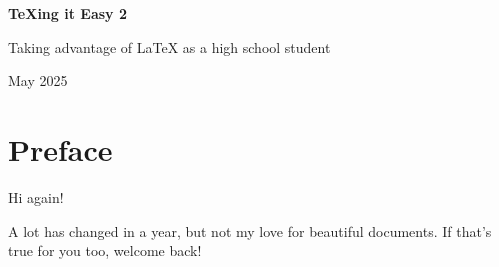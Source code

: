\documentclass[letterpaper, 12pt]{article}
\begin{document}
\begin{titlepage}
    \centering
    \vspace*{2cm}
    {\Huge \bfseries \TeX ing it Easy 2\par}
    \vspace{2cm}
    {\Large Taking advantage of \LaTeX{} as a high school student \par}
    \vfill
    {\large May 2025\par}
\end{titlepage}

\tableofcontents

\fancyhf{}
\fancyfoot[C]{\thepage}

\nocite{*}

\newpage

\section*{Preface}

\fancyhf{}
\fancyfoot[C]{\thepage}


Hi again!

A lot has changed in a year, but not my love for beautiful documents. If that's true for you too, welcome back!

\fancyhf{}
\fancyfoot[C]{\thepage}
\end{document}
